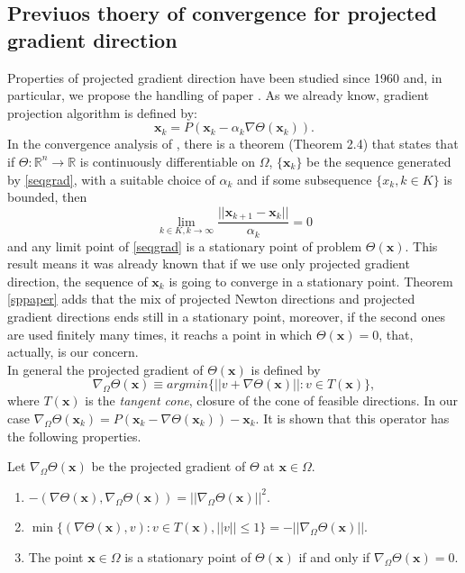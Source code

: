 \subsection{Previuos thoery of convergence for projected gradient direction}
Properties of projected gradient direction have been studied since 1960 and, in particular, we propose the handling of paper \cite{Calamai}. 
As we already know, gradient projection algorithm is defined by: 
\begin{equation}
\label{seqgrad}
\textbf{x}_k = P (\textbf{x}_k - \alpha_k \nabla \Theta(\textbf{x}_k)).
\end{equation}
In the convergence analysis of \cite{Calamai}, there is a theorem (Theorem 2.4) that states that if $\Theta : \mathbb{R}^n\rightarrow \mathbb{R}  $ is continuously differentiable on $ \Omega $, $ \{\textbf{x}_k\} $ be the sequence generated by \eqref{seqgrad}, with a suitable choice of $ \alpha_k $ and if some subsequence $ \{x_k, k \in K\} $ is bounded, then 
\begin{equation*}
\lim_{k \in K, k \rightarrow \infty} \frac{||\textbf{x}_{k+1} - \textbf{x}_k||}{\alpha_k} = 0
\end{equation*}
and any limit point of \eqref{seqgrad} is a stationary point of problem $\Theta(\textbf{x})$.
This result means it was already known that if we use only projected gradient direction, the sequence of $ \textbf{x}_k $ is going to converge in a stationary point. Theorem \ref{sppaper} adds that the mix of projected Newton directions and projected gradient directions ends still in a stationary point, moreover, if the second ones are used finitely many times, it reachs a point in which $ \Theta(\textbf{x}) = 0 $, that, actually, is our concern. \\
In general the projected gradient of $ \Theta(\textbf{x}) $ is defined by 
\begin{equation}
\nabla_{\Omega} \Theta( \textbf{x} ) \equiv argmin \{ || v + \nabla  \Theta ( \textbf{x} ) || : v \in T( \textbf{x} ) \},
\end{equation} 
where $T(\textbf{x}) $ is the \textit{tangent cone}, closure of the cone of feasible directions. In our case $ \nabla_{\Omega} \Theta (\textbf{x}_k) =  P(\textbf{x}_k - \nabla \Theta(\textbf{x}_k)) - \textbf{x}_k $. It is shown that this operator has the following properties. 
\begin{lem}
	Let $ \nabla_{\Omega} \Theta (\textbf{x}) $ be the projected gradient of $ \Theta $ at $ \textbf{x} \in \Omega$.
	\begin{enumerate}[label=(\alph*)]
		\item $ -(\nabla \Theta (\textbf{x}),\nabla_{\Omega} \Theta (\textbf{x})  )= ||\nabla_{\Omega} \Theta (\textbf{x})||^2 $.
		\item $ \min \{(\nabla \Theta (\textbf{x}),v) : v \in T(\textbf{x}), ||v|| \leq 1 \} = - || \nabla_{\Omega} \Theta (\textbf{x})||$.
		\item The point $ \textbf{x} \in \Omega $ is a stationary point of $ \Theta(\textbf{x}) $ if and only if $ \nabla_{\Omega} \Theta(\textbf{x}) = 0 $.
	\end{enumerate}
\end{lem}
